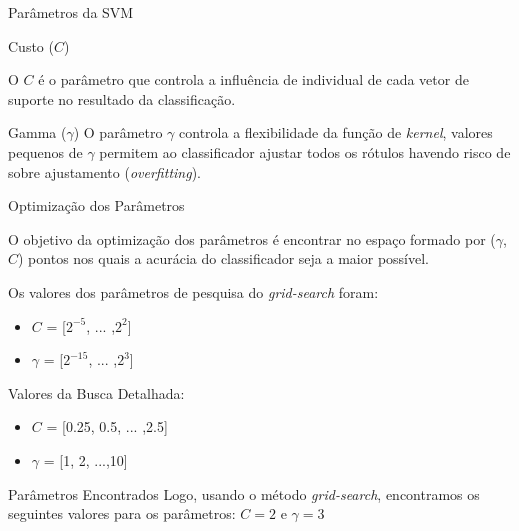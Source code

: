 \documentclass{beamer}
\begin{document}
\begin{frame}{Parâmetros da SVM}
   \begin{block}{Custo ($C$)}
   
   O $C$ é o parâmetro que controla a influência de individual de cada vetor de suporte no resultado da classificação. 
   
   
   \end{block}
   
   \begin{block}{Gamma ($\gamma$)}
   O parâmetro $\gamma$ controla a flexibilidade da função de \textit{kernel}, valores pequenos de $\gamma$ permitem ao classificador ajustar todos os rótulos havendo risco de sobre ajustamento (\textit{overfitting}). 
   
   \end{block}
\end{frame}

\begin{frame}{Optimização dos Parâmetros}
 \begin{block}{}
 O objetivo da optimização dos parâmetros é encontrar no espaço formado por ($\gamma$, $C$) pontos nos quais a acurácia do classificador seja a maior possível.
  
 Os valores dos parâmetros de pesquisa do \textit{grid-search} foram:
 \begin{itemize}
  \item $C$ = [$2^{-5}$, ... ,$2^2$]
  \item $\gamma$ = [$2^{-15}$, ... ,$2^3$]
 \end{itemize}

 Valores da Busca Detalhada:
  \begin{itemize}
   \item $C$ = [0.25, 0.5, ... ,2.5]
   \item $\gamma$ = [1, 2, ...,10]
  \end{itemize}
 \end{block}
 
 \begin{block}{Parâmetros Encontrados}
  Logo, usando o método \textit{grid-search}, encontramos os seguintes valores para os parâmetros: $C = 2$ e $\gamma = 3$
 \end{block}
\end{frame}
\end{document}
